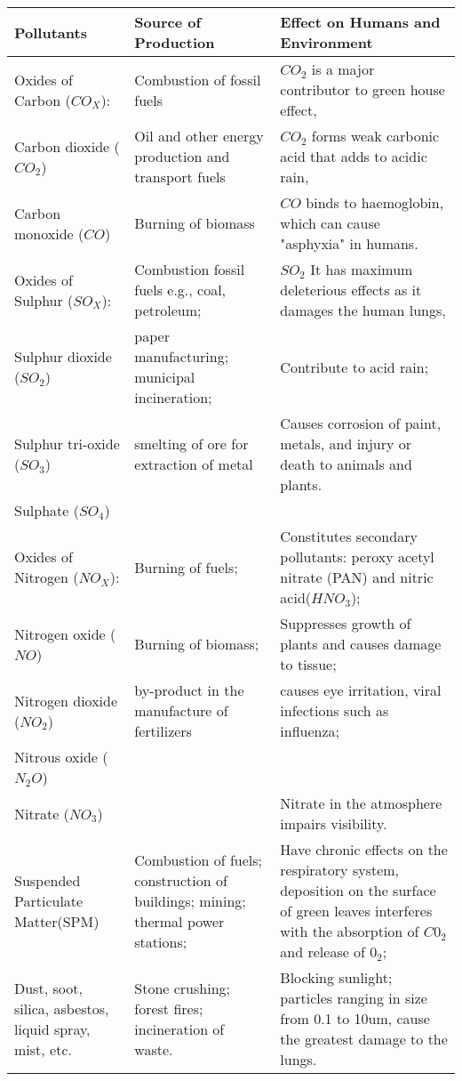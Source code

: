 \begin{table}
    \centering
    \begin{adjustbox}{width=\textwidth}
    \begin{tabular}{|p{3.5cm}|p{6cm}|p{7cm}|}
        \hline
        \textbf{Pollutants} & \textbf{Source of Production} & \textbf{Effect on Humans and Environment} \\
        \hline
        Oxides of Carbon ($CO_X$): & Combustion of fossil fuels & $CO_2$ is a major contributor to green house effect, \\
        Carbon dioxide ($CO_2$) & Oil and other energy production and transport fuels & $CO_2$ forms weak carbonic acid that adds to acidic rain, \\
        Carbon monoxide ($CO$) & Burning of biomass & $CO$ binds to haemoglobin, which can cause "asphyxia" in humans. \\
        \hline

        Oxides of Sulphur ($SO_X$): & Combustion fossil fuels e.g., coal, petroleum; & $SO_2$ It has maximum deleterious effects as it damages the human lungs, \\
        Sulphur dioxide ($SO_2$) & paper manufacturing; municipal incineration; & Contribute to acid rain; \\
        Sulphur tri-oxide ($SO_3$) & smelting of ore for extraction of metal &  Causes corrosion of paint, metals, and injury or death to animals and plants. \\
        Sulphate ($SO_4$) & & \\
        \hline

        Oxides of Nitrogen ($NO_X$): & Burning of fuels; & Constitutes secondary pollutants: peroxy acetyl nitrate (PAN) and nitric acid($HNO_3$); \\
        Nitrogen oxide ($NO$) & Burning of biomass; & Suppresses growth of plants and causes damage to tissue; \\
        Nitrogen dioxide ($NO_2$) & by-product in the manufacture of fertilizers & causes eye irritation, viral infections such as influenza; \\
        Nitrous oxide ($N_2O$) & &  \\
        Nitrate ($NO_3$) & & Nitrate in the atmosphere impairs visibility. \\
        \hline

        Suspended Particulate Matter(SPM) & Combustion of fuels; construction of buildings; mining; thermal power stations; & Have chronic effects on the respiratory system, deposition on the surface of green leaves interferes with the absorption of $C0_2$ and release of $0_2$; \\
       Dust, soot, silica, asbestos, liquid spray, mist, etc. & Stone crushing; forest fires; incineration of waste.& Blocking sunlight; particles ranging in size from 0.1 to 10um, cause the greatest damage to the lungs. \\
        \hline


\end{tabular}
\end{adjustbox}
\end{table}
